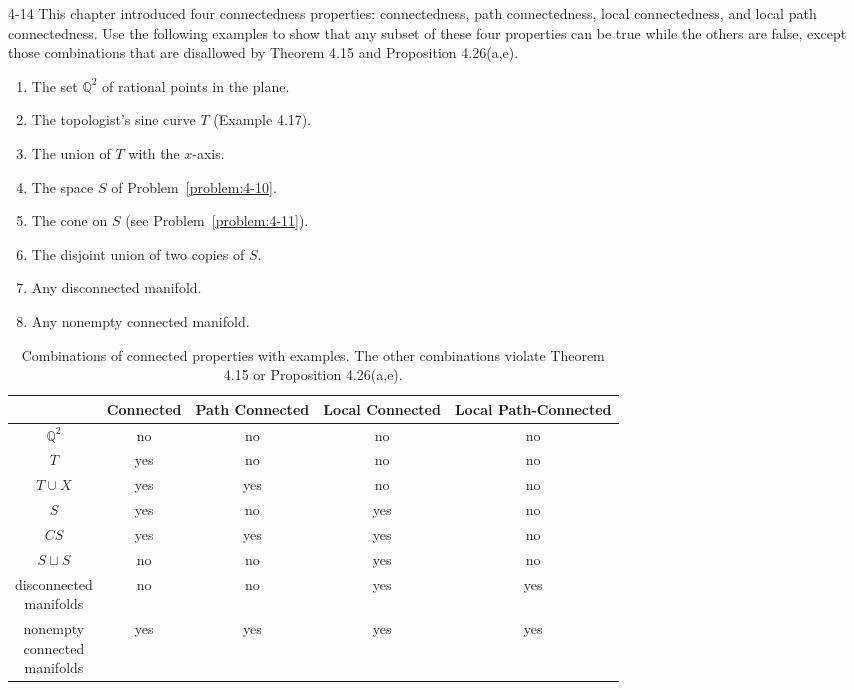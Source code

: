 \begin{problem}{4-14}
This chapter introduced four connectedness properties: connectedness, path connectedness, local connectedness, and local path connectedness. Use the following examples to show that any subset of these four properties can be true while the others are false, except those combinations that are disallowed by Theorem 4.15 and Proposition 4.26(a,e).
\begin{enumerate}[label={(\alph*)}]
	\item The set $\mathbb{Q}^{2}$ of rational points in the plane.
	\item The topologist's sine curve $T$ (Example 4.17).
	\item The union of $T$ with the $x$-axis.
	\item The space $S$ of Problem~\ref{problem:4-10}.
	\item The cone on $S$ (see Problem~\ref{problem:4-11}).
	\item The disjoint union of two copies of $S$.
	\item Any disconnected manifold.
	\item Any nonempty connected manifold.
\end{enumerate}
\end{problem}

\begin{table}[htp]
	\centering
	\begin{tabular*}{\textwidth}{c|c|c|c|c}
		& Connected & Path Connected & Local Connected & Local Path-Connected \\
		\toprule
		\bottomrule
		$\mathbb{Q}^{2}$ & no        & no             & no              & no \\
		\hline
		$T$              & yes       & no             & no              & no \\
		\hline
		$T\cup X$        & yes       & yes            & no              & no \\
		\hline
		$S$              & yes       & no             & yes             & no \\
		\hline
		$CS$             & yes       & yes            & yes             & no \\
		\hline
		$S\sqcup S$      & no        & no             & yes             & no \\
		\hline
		\makecell{disconnected \\ manifolds}              & no        & no             & yes             & yes \\
		\hline
		\makecell{nonempty \\ connected \\ manifolds}              & yes       & yes            & yes             & yes
	\end{tabular*}
	\caption{Combinations of connected properties with examples. The other combinations violate Theorem 4.15 or Proposition 4.26(a,e).}
\end{table}

